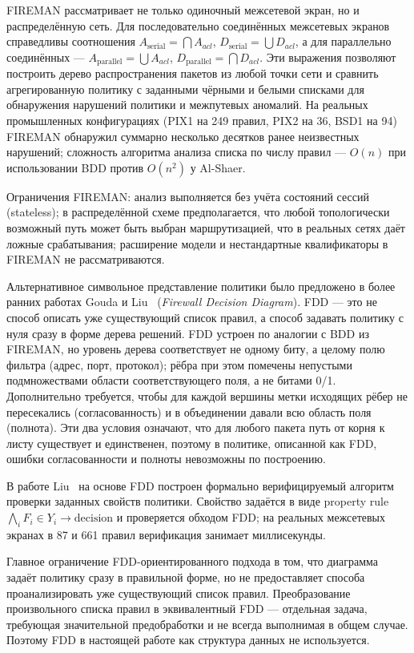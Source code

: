 FIREMAN рассматривает не только одиночный межсетевой экран, но и распределённую сеть. Для последовательно соединённых межсетевых экранов справедливы соотношения $A_{\text{serial}} = \bigcap A_{acl}$, $D_{\text{serial}} = \bigcup D_{acl}$, а для параллельно соединённых --- $A_{\text{parallel}} = \bigcup A_{acl}$, $D_{\text{parallel}} = \bigcap D_{acl}$. Эти выражения позволяют построить дерево распространения пакетов из любой точки сети и сравнить агрегированную политику с заданными чёрными и белыми списками для обнаружения нарушений политики и межпутевых аномалий. На реальных промышленных конфигурациях (PIX1 на 249 правил, PIX2 на 36, BSD1 на 94) FIREMAN обнаружил суммарно несколько десятков ранее неизвестных нарушений; сложность алгоритма анализа списка по числу правил --- $O(n)$ при использовании BDD против $O(n^2)$ у Al-Shaer.

Ограничения FIREMAN: анализ выполняется без учёта состояний сессий (stateless); в распределённой схеме предполагается, что любой топологически возможный путь может быть выбран маршрутизацией, что в реальных сетях даёт ложные срабатывания; расширение модели и нестандартные квалификаторы в FIREMAN не рассматриваются.

Альтернативное символьное представление политики было предложено в более ранних работах Gouda и Liu~\cite{gouda2004firewall} (\emph{Firewall Decision Diagram}). FDD --- это не способ описать уже существующий список правил, а способ задавать политику с нуля сразу в форме дерева решений. FDD устроен по аналогии с BDD из FIREMAN, но уровень дерева соответствует не одному биту, а целому полю фильтра (адрес, порт, протокол); рёбра при этом помечены непустыми подмножествами области соответствующего поля, а не битами 0/1. Дополнительно требуется, чтобы для каждой вершины метки исходящих рёбер не пересекались (согласованность) и в объединении давали всю область поля (полнота). Эти два условия означают, что для любого пакета путь от корня к листу существует и единственен, поэтому в политике, описанной как FDD, ошибки согласованности и полноты невозможны по построению.

В работе Liu~\cite{liu2008formal} на основе FDD построен формально верифицируемый алгоритм проверки заданных свойств политики. Свойство задаётся в виде property rule $\bigwedge_i F_i \in Y_i \to \text{decision}$ и проверяется обходом FDD; на реальных межсетевых экранах в 87 и 661 правил верификация занимает миллисекунды.

Главное ограничение FDD-ориентированного подхода в том, что диаграмма задаёт политику сразу в правильной форме, но не предоставляет способа проанализировать уже существующий список правил. Преобразование произвольного списка правил в эквивалентный FDD --- отдельная задача, требующая значительной предобработки и не всегда выполнимая в общем случае. Поэтому FDD в настоящей работе как структура данных не используется.

